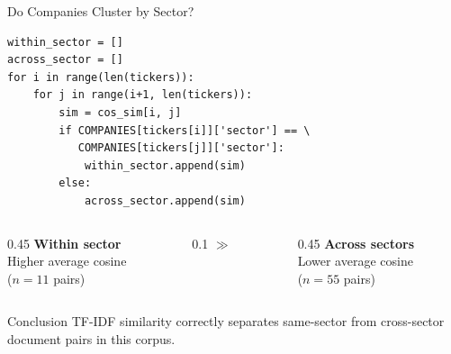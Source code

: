 \documentclass[aspectratio=169,11pt]{beamer}
\begin{document}
\begin{frame}[fragile]{Do Companies Cluster by Sector?}

\begin{lstlisting}
within_sector = []
across_sector = []
for i in range(len(tickers)):
    for j in range(i+1, len(tickers)):
        sim = cos_sim[i, j]
        if COMPANIES[tickers[i]]['sector'] == \
           COMPANIES[tickers[j]]['sector']:
            within_sector.append(sim)
        else:
            across_sector.append(sim)
\end{lstlisting}

\vspace{6pt}
\begin{columns}[c]
\begin{column}{0.45\textwidth}
\centering
\textbf{Within sector}\\[4pt]
Higher average cosine\\
($n = 11$ pairs)
\end{column}
\begin{column}{0.1\textwidth}
\centering
\Large $\gg$
\end{column}
\begin{column}{0.45\textwidth}
\centering
\textbf{Across sectors}\\[4pt]
Lower average cosine\\
($n = 55$ pairs)
\end{column}
\end{columns}

\vspace{6pt}
\begin{block}{Conclusion}
TF-IDF similarity correctly separates same-sector from
cross-sector document pairs in this corpus.
\end{block}

\end{frame}
\end{document}
